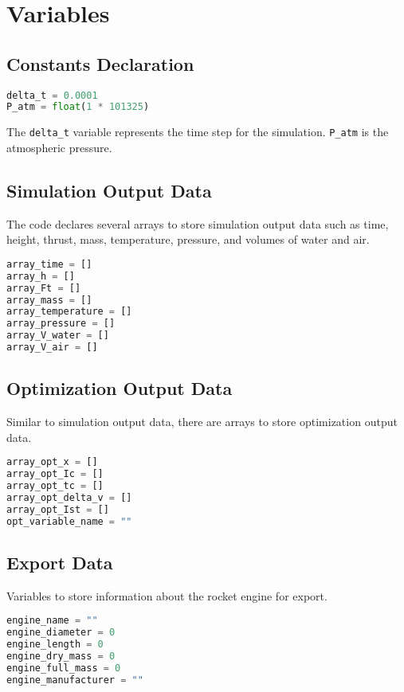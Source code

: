 \documentclass{report}
\begin{document}
\chapter{Variables}

\section{Constants Declaration}
 
\begin{lstlisting}[language=Python]
delta_t = 0.0001
P_atm = float(1 * 101325)
\end{lstlisting}
The \texttt{delta\_t} variable represents the time step for the simulation. \texttt{P\_atm} is the atmospheric pressure.

\section{Simulation Output Data}

The code declares several arrays to store simulation output data such as time, height, thrust, mass, temperature, pressure, and volumes of water and air.

\begin{lstlisting}[language=Python]
array_time = []
array_h = []
array_Ft = []
array_mass = []
array_temperature = []
array_pressure = []
array_V_water = []
array_V_air = []
\end{lstlisting}

\section{Optimization Output Data}

Similar to simulation output data, there are arrays to store optimization output data.

\begin{lstlisting}[language=Python]
array_opt_x = []
array_opt_Ic = []
array_opt_tc = []
array_opt_delta_v = []
array_opt_Ist = []
opt_variable_name = ""
\end{lstlisting}

\section{Export Data}

Variables to store information about the rocket engine for export.

\begin{lstlisting}[language=Python]
engine_name = ""
engine_diameter = 0
engine_length = 0
engine_dry_mass = 0
engine_full_mass = 0
engine_manufacturer = ""
\end{lstlisting}
\end{document}

